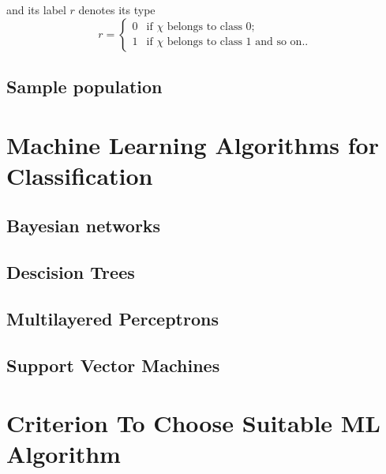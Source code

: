 and its label $r$ denotes its type
\[ r = \left\{ \begin{array}{ll}
         0 & \mbox{if $\chi$ belongs to class 0};\\
         1 & \mbox{if $\chi$ belongs to class 1 and so on..}\end{array} \right. \] 


\subsection{Sample population}

\section{Machine Learning Algorithms for Classification}
\label{sec:c3mlclassification}

\subsection{Bayesian networks}

\subsection{Descision Trees}

\subsection{Multilayered Perceptrons}

\subsection{Support Vector Machines}

\section{Criterion To Choose Suitable ML Algorithm}
\label{sec:c3mlselection}
